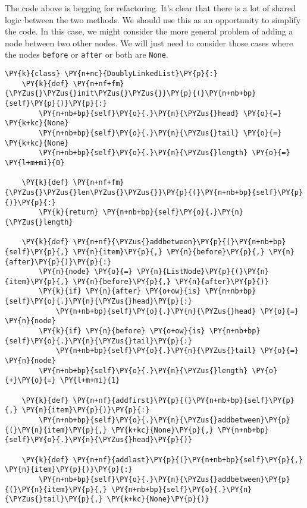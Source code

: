 The code above is begging for refactoring.
It's clear that there is a lot of shared logic between the two methods.
We should use this as an opportunity to simplify the code.
In this case, we might consider the more general problem of adding a node between two other nodes.
We will just need to consider those cases where the nodes \texttt{before} or \texttt{after} or both are \texttt{None}.

\begin{Verbatim}[commandchars=\\\{\}]
\PY{k}{class} \PY{n+nc}{DoublyLinkedList}\PY{p}{:}
    \PY{k}{def} \PY{n+nf+fm}{\PYZus{}\PYZus{}init\PYZus{}\PYZus{}}\PY{p}{(}\PY{n+nb+bp}{self}\PY{p}{)}\PY{p}{:}
        \PY{n+nb+bp}{self}\PY{o}{.}\PY{n}{\PYZus{}head} \PY{o}{=} \PY{k+kc}{None}
        \PY{n+nb+bp}{self}\PY{o}{.}\PY{n}{\PYZus{}tail} \PY{o}{=} \PY{k+kc}{None}
        \PY{n+nb+bp}{self}\PY{o}{.}\PY{n}{\PYZus{}length} \PY{o}{=} \PY{l+m+mi}{0}

    \PY{k}{def} \PY{n+nf+fm}{\PYZus{}\PYZus{}len\PYZus{}\PYZus{}}\PY{p}{(}\PY{n+nb+bp}{self}\PY{p}{)}\PY{p}{:}
        \PY{k}{return} \PY{n+nb+bp}{self}\PY{o}{.}\PY{n}{\PYZus{}length}

    \PY{k}{def} \PY{n+nf}{\PYZus{}addbetween}\PY{p}{(}\PY{n+nb+bp}{self}\PY{p}{,} \PY{n}{item}\PY{p}{,} \PY{n}{before}\PY{p}{,} \PY{n}{after}\PY{p}{)}\PY{p}{:}
        \PY{n}{node} \PY{o}{=} \PY{n}{ListNode}\PY{p}{(}\PY{n}{item}\PY{p}{,} \PY{n}{before}\PY{p}{,} \PY{n}{after}\PY{p}{)}
        \PY{k}{if} \PY{n}{after} \PY{o+ow}{is} \PY{n+nb+bp}{self}\PY{o}{.}\PY{n}{\PYZus{}head}\PY{p}{:}
            \PY{n+nb+bp}{self}\PY{o}{.}\PY{n}{\PYZus{}head} \PY{o}{=} \PY{n}{node}
        \PY{k}{if} \PY{n}{before} \PY{o+ow}{is} \PY{n+nb+bp}{self}\PY{o}{.}\PY{n}{\PYZus{}tail}\PY{p}{:}
            \PY{n+nb+bp}{self}\PY{o}{.}\PY{n}{\PYZus{}tail} \PY{o}{=} \PY{n}{node}
        \PY{n+nb+bp}{self}\PY{o}{.}\PY{n}{\PYZus{}length} \PY{o}{+}\PY{o}{=} \PY{l+m+mi}{1}

    \PY{k}{def} \PY{n+nf}{addfirst}\PY{p}{(}\PY{n+nb+bp}{self}\PY{p}{,} \PY{n}{item}\PY{p}{)}\PY{p}{:}
        \PY{n+nb+bp}{self}\PY{o}{.}\PY{n}{\PYZus{}addbetween}\PY{p}{(}\PY{n}{item}\PY{p}{,} \PY{k+kc}{None}\PY{p}{,} \PY{n+nb+bp}{self}\PY{o}{.}\PY{n}{\PYZus{}head}\PY{p}{)}

    \PY{k}{def} \PY{n+nf}{addlast}\PY{p}{(}\PY{n+nb+bp}{self}\PY{p}{,} \PY{n}{item}\PY{p}{)}\PY{p}{:}
        \PY{n+nb+bp}{self}\PY{o}{.}\PY{n}{\PYZus{}addbetween}\PY{p}{(}\PY{n}{item}\PY{p}{,} \PY{n+nb+bp}{self}\PY{o}{.}\PY{n}{\PYZus{}tail}\PY{p}{,} \PY{k+kc}{None}\PY{p}{)}
\end{Verbatim}



